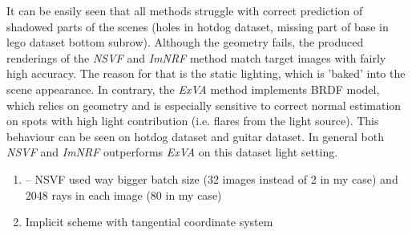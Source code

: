 It can be easily seen that all methods struggle
with correct prediction of shadowed parts of the scenes
(holes in hotdog dataset, missing part of base in lego dataset bottom subrow).
Although the geometry fails, the produced renderings
of the \textit{NSVF} and \textit{ImNRF} method match target images with fairly high accuracy.
The reason for that is the static lighting, which is 'baked' into the scene appearance.
In contrary, the \textit{ExVA} method implements BRDF model,
which relies on geometry and is especially sensitive to correct normal estimation
on spots with high light contribution (i.e. flares from the light source).
This behaviour can be seen on hotdog dataset and guitar dataset.
In general both \textit{NSVF} and \textit{ImNRF} outperforms \textit{ExVA} on this dataset light setting.



\begin{enumerate}
    \item {}
    -- NSVF used way bigger batch size (32 images instead of 2 in my case) and 2048 rays in each image (80 in my case)
    \item Implicit scheme with tangential coordinate system
\end{enumerate}














